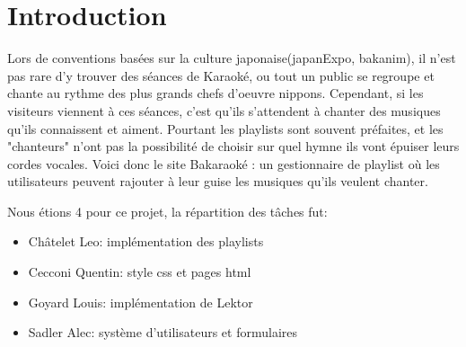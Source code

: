 \section{Introduction}
    Lors de conventions basées sur la culture japonaise(japanExpo, bakanim), il n'est pas rare d'y trouver des séances de Karaoké, ou tout un public se regroupe et chante au rythme des plus grands chefs d'oeuvre nippons.\newline
Cependant, si les visiteurs viennent à ces séances, c'est qu'ils s'attendent à chanter des musiques qu'ils connaissent et aiment. Pourtant les playlists sont souvent préfaites, et les "chanteurs" n'ont pas la possibilité de choisir sur quel hymne ils vont épuiser leurs cordes vocales. \newline
Voici donc le site Bakaraoké : un gestionnaire de playlist où les utilisateurs peuvent rajouter à leur guise les musiques qu'ils veulent chanter. \newline

Nous étions 4 pour ce projet, la répartition des tâches fut:
\begin{itemize}
	\item Châtelet Leo: implémentation des playlists
	\item Cecconi Quentin: style css et pages html
	\item Goyard Louis: implémentation de Lektor
	\item Sadler Alec: système d'utilisateurs et formulaires
\end{itemize}
\newline



